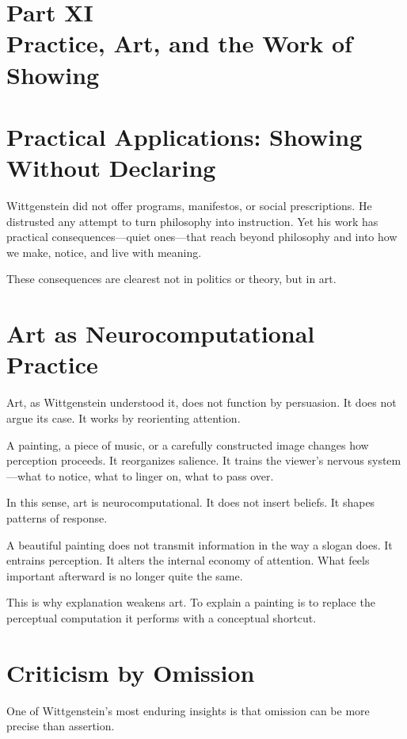 \documentclass[11pt]{article}
\begin{document}
\newpage
\section*{Part XI \\ Practice, Art, and the Work of Showing}

\section*{Practical Applications: Showing Without Declaring}

Wittgenstein did not offer programs, manifestos, or social prescriptions. He distrusted any attempt to turn philosophy into instruction. Yet his work has practical consequences—quiet ones—that reach beyond philosophy and into how we make, notice, and live with meaning.

These consequences are clearest not in politics or theory, but in art.

\section*{Art as Neurocomputational Practice}

Art, as Wittgenstein understood it, does not function by persuasion. It does not argue its case. It works by reorienting attention.

A painting, a piece of music, or a carefully constructed image changes how perception proceeds. It reorganizes salience. It trains the viewer’s nervous system—what to notice, what to linger on, what to pass over.

In this sense, art is neurocomputational. It does not insert beliefs. It shapes patterns of response.

A beautiful painting does not transmit information in the way a slogan does. It entrains perception. It alters the internal economy of attention. What feels important afterward is no longer quite the same.

This is why explanation weakens art. To explain a painting is to replace the perceptual computation it performs with a conceptual shortcut.

\section*{Criticism by Omission}

One of Wittgenstein’s most enduring insights is that omission can be more precise than assertion.
\end{document}
